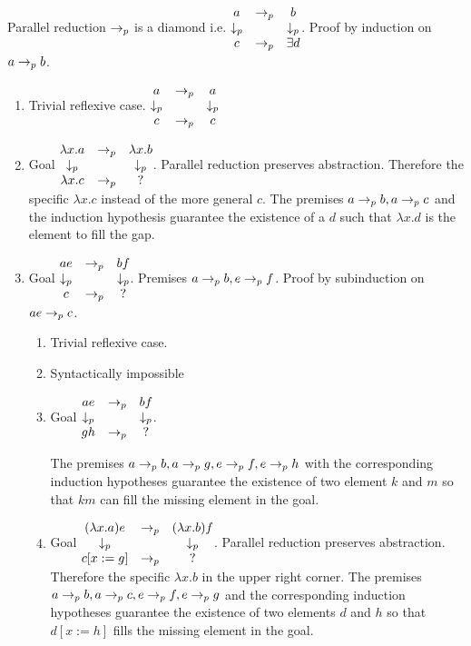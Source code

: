 \begin{theorem}
  Parallel reduction $\to_{p}$ is a diamond i.e.
  $\begin{matrix}
    a & \to_{p} & b \\
    \downarrow_p & & \downarrow_p \\
    c & \to_{p} & \exists d
  \end{matrix}
  $.
  Proof by induction on $a \to_{p} b$.
  \begin{enumerate}
  \item
    Trivial reflexive case.
    $\begin{matrix} a & \to_p & a \\ \downarrow_p & & \downarrow_p \\ c & \to_p & c \end{matrix}
    $

  \item Goal
    $\begin{matrix} \lambda x.a & \to_p & \lambda x.b \\ \downarrow_p & & \downarrow_p \\ \lambda x.c & \to_p & ? \end{matrix}$.
    Parallel reduction preserves abstraction. Therefore the specific
    $\lambda x.c$ instead of the more general $c$.
    The premises $a\to_{p} b, a \to_{p} c$ and the induction hypothesis
    guarantee the existence of a $d$ such that $\lambda x.d$ is the element
    to fill the gap.

  \item
    Goal $\begin{matrix} a e & \to_p & b f \\ \downarrow_p & & \downarrow_p \\ c & \to_p & ? \end{matrix}$. Premises $a \to_{p} b, e \to_{p} f$.
    Proof by subinduction on $a e \to_{p} c$.

    \begin{enumerate}
    \item Trivial reflexive case.
    \item Syntactically impossible
    \item
      Goal $\begin{matrix} a e & \to_p & b f \\ \downarrow_p & & \downarrow_p \\ g h & \to_p & ? \end{matrix}$.

      The premises $a \to_{p} b, a \to_{p} g, e \to_{p} f, e \to_{p} h$
      with the corresponding induction hypotheses guarantee the existence of
      two element $k$ and $m$ so that $ k m$ can fill the missing element in
      the goal.

    \item
      Goal $\begin{matrix} (\lambda x.a) e & \to_p & (\lambda x.b) f \\ \downarrow_p & & \downarrow_p \\ c[x:=g] & \to_p & ? \end{matrix}$.
      Parallel reduction preserves abstraction. Therefore the specific
      $\lambda x.b$ in the upper right corner.
      The premises $a \to_{p} b, a \to_{p} c, e \to_{p} f, e \to_{p} g$
      and the corresponding induction hypotheses guarantee the existence of
      two elements $d$ and $h$ so that $d[x:=h]$ fills the missing element
      in the goal.
    \end{enumerate}


\end{enumerate}
\end{theorem}
